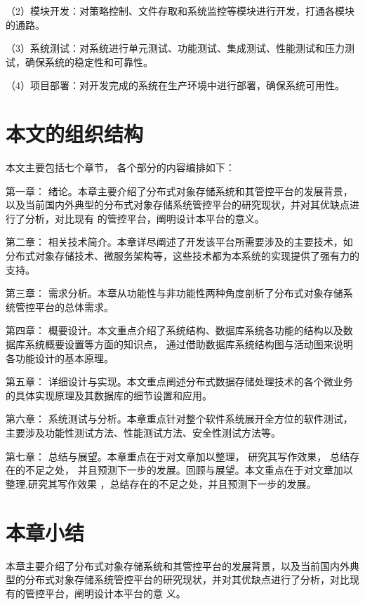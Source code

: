 （2）模块开发：对策略控制、文件存取和系统监控等模块进行开发，打通各模块的通路。

（3）系统测试：对系统进行单元测试、功能测试、集成测试、性能测试和压力测试，确保系统的稳定性和可靠性。

（4）项目部署：对开发完成的系统在生产环境中进行部署，确保系统可用性。

\section{本文的组织结构}

本文主要包括七个章节， 各个部分的内容编排如下： 

第一章： 绪论。本章主要介绍了分布式对象存储系统和其管控平台的发展背景，以及当前国内外典型的分布式对象存储系统管控平台的研究现状，并对其优缺点进行了分析，对比现有
的管控平台，阐明设计本平台的意义。

第二章： 相关技术简介。本章详尽阐述了开发该平台所需要涉及的主要技术，如分布式对象存储技术、微服务架构等，这些技术都为本系统的实现提供了强有力的支持。

第三章： 需求分析。本章从功能性与非功能性两种角度剖析了分布式对象存储系统管控平台的总体需求。

第四章： 概要设计。本文重点介绍了系统结构、数据库系统各功能的结构以及数据库系统概要设置等方面的知识点， 通过借助数据库系统结构图与活动图来说明各功能设计的基本原理。

第五章： 详细设计与实现。本文重点阐述分布式数据存储处理技术的各个微业务的具体实现原理及其数据库的细节设置和应用。

第六章： 系统测试与分析。本章重点针对整个软件系统展开全方位的软件测试， 主要涉及功能性测试方法、性能测试方法、安全性测试方法等。

第七章： 总结与展望。本章重点在于对文章加以整理， 研究其写作效果， 总结存在的不足之处， 并且预测下一步的发展。回顾与展望。本文重点在于对文章加以整理,研究其写作效果
，总结存在的不足之处，并且预测下一步的发展。


\section{本章小结}

本章主要介绍了分布式对象存储系统和其管控平台的发展背景，以及当前国内外典型的分布式对象存储系统管控平台的研究现状，并对其优缺点进行了分析，对比现有的管控平台，阐明设计本平台的意
义。